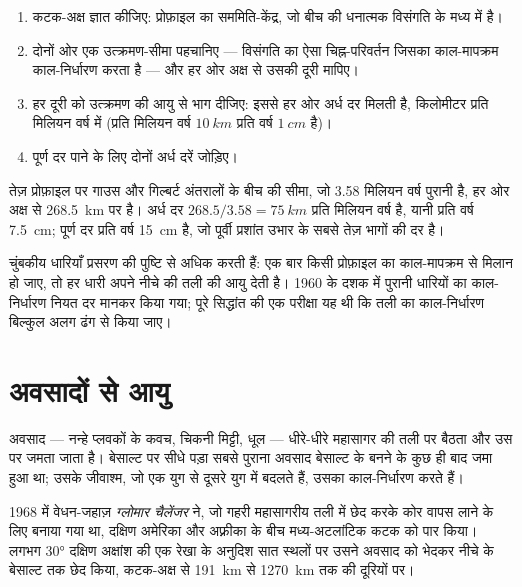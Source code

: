 \begin{method}[चुंबकीय प्रोफ़ाइल से प्रसरण दर]\label{met:g11:drift-to-spreading:rate}
\begin{enumerate}
  \item कटक-अक्ष ज्ञात कीजिए: प्रोफ़ाइल का सममिति-केंद्र, जो
        बीच की धनात्मक विसंगति के मध्य में है।
  \item दोनों ओर एक उत्क्रमण-सीमा पहचानिए --- विसंगति का ऐसा चिह्न-परिवर्तन
        जिसका काल-मापक्रम काल-निर्धारण करता है --- और हर ओर अक्ष से उसकी
        दूरी मापिए।
  \item हर दूरी को उत्क्रमण की आयु से भाग दीजिए: इससे हर ओर अर्ध
        दर मिलती है, किलोमीटर प्रति मिलियन वर्ष में
        (प्रति मिलियन वर्ष $\qty{10}{km}$ प्रति वर्ष $\qty{1}{cm}$ है)।
  \item पूर्ण दर पाने के लिए दोनों अर्ध दरें जोड़िए।
\end{enumerate}
\end{method}

\begin{example}[तेज़ कटक]\label{ex:g11:drift-to-spreading:fast}
तेज़ प्रोफ़ाइल पर गाउस और गिल्बर्ट अंतरालों के बीच की सीमा,
जो \num{3.58} मिलियन वर्ष पुरानी है, हर ओर अक्ष से \qty{268.5}{km} पर है।
अर्ध दर $268.5/3.58 = \qty{75}{km}$ प्रति मिलियन वर्ष है, यानी
प्रति वर्ष \qty{7.5}{cm}; पूर्ण दर प्रति वर्ष \qty{15}{cm} है, जो पूर्वी प्रशांत उभार के
सबसे तेज़ भागों की दर है।
\end{example}

चुंबकीय धारियाँ प्रसरण की पुष्टि से अधिक करती हैं: एक बार किसी प्रोफ़ाइल का
काल-मापक्रम से मिलान हो जाए, तो हर धारी अपने नीचे की तली की आयु देती है।
1960 के दशक में पुरानी धारियों का काल-निर्धारण नियत दर मानकर किया गया; पूरे
सिद्धांत की एक परीक्षा यह थी कि तली का काल-निर्धारण बिल्कुल अलग ढंग से किया जाए।

\section{अवसादों से आयु}

अवसाद --- नन्हे प्लवकों के कवच, चिकनी मिट्टी, धूल --- धीरे-धीरे महासागर की तली पर बैठता
और उस पर जमता जाता है। बेसाल्ट पर सीधे पड़ा सबसे पुराना अवसाद
बेसाल्ट के बनने के कुछ ही बाद जमा हुआ था; उसके जीवाश्म, जो
एक युग से दूसरे युग में बदलते हैं, उसका काल-निर्धारण करते हैं।

1968 में वेधन-जहाज़ \emph{ग्लोमार चैलेंजर} ने, जो गहरी
महासागरीय तली में छेद करके कोर वापस लाने के लिए बनाया गया था, दक्षिण अमेरिका और अफ़्रीका के बीच
मध्य-अटलांटिक कटक को पार किया। लगभग \ang{30} दक्षिण अक्षांश की एक रेखा के अनुदिश सात स्थलों पर
उसने अवसाद को भेदकर नीचे के बेसाल्ट तक छेद किया,
कटक-अक्ष से \qty{191}{km} से \qty{1270}{km} तक की दूरियों पर।

